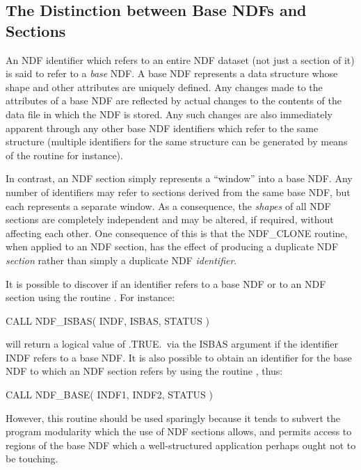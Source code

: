 \documentclass[twoside,11pt,nolof]{starlink}
\providecommand{\st}[1]{{\emph{#1}}}
\begin{document}
\subsection{The Distinction between Base NDFs and Sections}

An NDF identifier which refers to an entire NDF dataset (not just a section
of it) is said to refer to a \st{base\/} NDF.
A base NDF represents a data structure whose shape and other attributes are
uniquely defined.
Any changes made to the attributes of a base NDF are reflected by actual
changes to the contents of the data file in which the NDF is stored.
Any such changes are also immediately apparent through any other base NDF
identifiers which refer to the same structure (multiple identifiers for the
same structure can be generated by means of the routine  for
instance).

In contrast, an NDF section simply represents a ``window'' into a base NDF.
Any number of identifiers may refer to sections derived from the same base
NDF, but each represents a separate window.
As a consequence, the \st{shapes\/} of all NDF sections are completely
independent and may be altered, if required, without affecting each other.
One consequence of this is that the NDF\_CLONE routine, when applied to an
NDF section, has the effect of producing a duplicate NDF \st{section\/}
rather than simply a duplicate NDF \st{identifier}.

It is possible to discover if an identifier refers to a base NDF or to an
NDF section using the routine .
For instance:

\small
\begin{terminalv}
      CALL NDF_ISBAS( INDF, ISBAS, STATUS )
\end{terminalv}
\normalsize

will return a logical value of .TRUE.\ via the ISBAS argument if the
identifier INDF refers to a base NDF.
It is also possible to obtain an identifier for the base NDF to which an NDF
section refers by using the routine , thus:

\small
\begin{terminalv}
      CALL NDF_BASE( INDF1, INDF2, STATUS )
\end{terminalv}
\normalsize

However, this routine should be used sparingly because it tends to subvert
the program modularity which the use of NDF sections allows, and permits
access to regions of the base NDF which a well-structured application perhaps
ought not to be touching.
\end{document}
